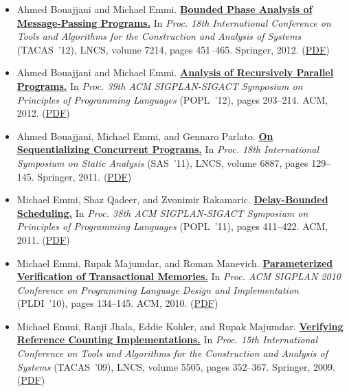 \documentclass{article}
\begin{document}
\begin{itemize}[leftmargin=0cm,label={}]
    \item Ahmed Bouajjani and Michael Emmi. {\bf\href{%
    http://dx.doi.org/10.1007/978-3-642-28756-5_31}{%
    Bounded Phase Analysis of Message-Passing Programs.}} In \emph{ Proc. 18th International Conference on Tools and Algorithms for the Construction and Analysis of Systems } (TACAS ’12), LNCS, volume 7214, pages 451–465. Springer, 2012. (\href{https://michael-emmi.github.io/https://github.com/michael-emmi/research-papers/raw/master/conf-tacas-BouajjaniE12.pdf}{PDF})


    \item Ahmed Bouajjani and Michael Emmi. {\bf\href{%
    http://doi.acm.org/10.1145/2103656.2103681}{%
    Analysis of Recursively Parallel Programs.}} In \emph{ Proc. 39th ACM SIGPLAN-SIGACT Symposium on Principles of Programming Languages } (POPL ’12), pages 203–214. ACM, 2012. (\href{https://michael-emmi.github.io/https://github.com/michael-emmi/research-papers/raw/master/conf-popl-BouajjaniE12.pdf}{PDF})


    \item Ahmed Bouajjani, Michael Emmi, and Gennaro Parlato. {\bf\href{%
    http://dx.doi.org/10.1007/978-3-642-23702-7_13}{%
    On Sequentializing Concurrent Programs.}} In \emph{ Proc. 18th International Symposium on Static Analysis } (SAS ’11), LNCS, volume 6887, pages 129–145. Springer, 2011. (\href{https://michael-emmi.github.io/https://github.com/michael-emmi/research-papers/raw/master/conf-sas-BouajjaniEP11.pdf}{PDF})


    \item Michael Emmi, Shaz Qadeer, and Zvonimir Rakamaric. {\bf\href{%
    http://doi.acm.org/10.1145/1926385.1926432}{%
    Delay-Bounded Scheduling.}} In \emph{ Proc. 38th ACM SIGPLAN-SIGACT Symposium on Principles of Programming Languages } (POPL ’11), pages 411–422. ACM, 2011. (\href{https://michael-emmi.github.io/https://github.com/michael-emmi/research-papers/raw/master/conf-popl-EmmiQR11.pdf}{PDF})


    \item Michael Emmi, Rupak Majumdar, and Roman Manevich. {\bf\href{%
    http://doi.acm.org/10.1145/1806596.1806613}{%
    Parameterized Verification of Transactional Memories.}} In \emph{ Proc. ACM SIGPLAN 2010 Conference on Programming Language Design and Implementation } (PLDI ’10), pages 134–145. ACM, 2010. (\href{https://michael-emmi.github.io/https://github.com/michael-emmi/research-papers/raw/master/conf-pldi-EmmiMM10.pdf}{PDF})


    \item Michael Emmi, Ranji Jhala, Eddie Kohler, and Rupak Majumdar. {\bf\href{%
    http://dx.doi.org/10.1007/978-3-642-00768-2_30}{%
    Verifying Reference Counting Implementations.}} In \emph{ Proc. 15th International Conference on Tools and Algorithms for the Construction and Analysis of Systems } (TACAS ’09), LNCS, volume 5505, pages 352–367. Springer, 2009. (\href{https://michael-emmi.github.io/https://github.com/michael-emmi/research-papers/raw/master/conf-tacas-EmmiJKM09.pdf}{PDF})



\end{itemize}
\end{document}
